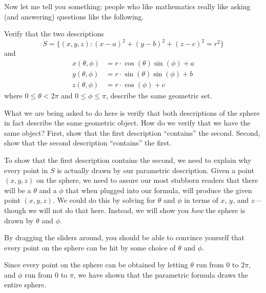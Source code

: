 \documentclass{ximera}
\begin{document}
 Now let me tell you something: people
who like mathematics really like asking (and answering) questions like
the following.

\begin{example}
  Verify that the two descriptions
  \[
  S = \{(x,y,z):(x-a)^2+(y-b)^2+(z-c)^2=r^2\}
  \]
  and
  \begin{align*}
    x(\theta,\phi) &=r\cdot\cos(\theta)\sin(\phi)+a\\
    y(\theta,\phi) &=r\cdot\sin(\theta)\sin(\phi)+b\\
    z(\theta,\phi) &=r\cdot\cos(\phi)+c
  \end{align*}
  where $0\le \theta<2\pi$ and $0\le \phi\le \pi$, describe the same
  geometric set.
  \begin{explanation}
    What we are being asked to do here is verify that both
    descriptions of the sphere in fact describe the same geometric
    object.  How do we verify that we have the same object? First, show that the first description
    ``contains'' the second.  Second, show that the second description ``contains'' the
    first.


To show that the first description contains the second, we need to explain why every point in $S$ is actually drawn by
    our parametric description. Given a point $(x,y,z)$ on the sphere,
    we need to assure our most stubborn readers that there will be a
    $\theta$ and a $\phi$ that when plugged into our formula, will
    produce the given point $(x,y,z)$. We could do this by solving for
    $\theta$ and $\phi$ in terms of $x$, $y$, and $z$---though we will
    not do that here. Instead, we will show you \textit{how} the
    sphere is drawn by $\theta$ and $\phi$.
 
      
      \begin{onlineOnly}
        By dragging the sliders around, you should be able to convince yourself that every point on the sphere can be hit by some choice of $\theta$ and $\phi$.
        
        \begin{center}
        \end{center}
      \end{onlineOnly}
 
      Since every point on the sphere can be obtained by letting
      $\theta$ run from $0$ to $2\pi$, and $\phi$ run from $0$ to
      $\pi$, we have shown that the parametric formula draws the
      entire sphere.



\end{explanation}
\end{example}
\end{document}
